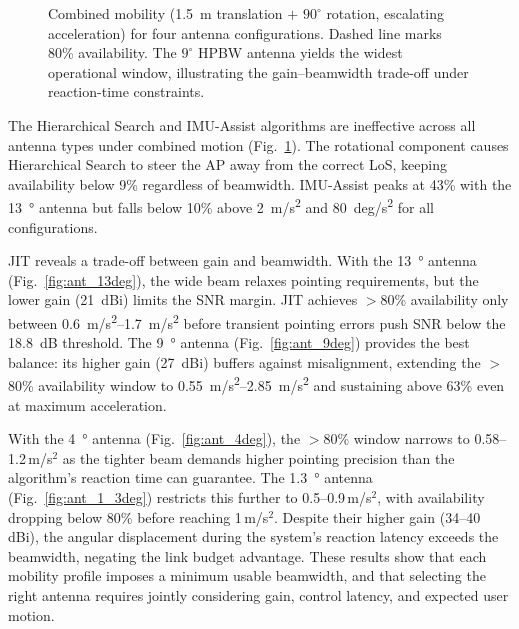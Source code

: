 \documentclass[fleqn,10pt]{wlscirep}
\newcommand{\legline}[2]{%
    \tikz[baseline=-0.5ex]{
        \draw[#1, #2, line width=1.5pt] (0,0) -- (0.5,0);
    }%
}
\begin{document}
\begin{figure}[ht!]
    
    \caption{Combined mobility (1.5~m translation $+$ $90^\circ$ rotation, escalating acceleration) for four antenna configurations. Dashed line marks 80\% availability. The $9^\circ$ HPBW antenna yields the widest operational window, illustrating the gain--beamwidth trade-off under reaction-time constraints.}
    \label{fig:antenna_comparison}
    \vspace{-5pt}
\end{figure}

The Hierarchical Search and IMU-Assist algorithms are ineffective across all antenna types under combined motion (Fig.~\ref{fig:antenna_comparison}). The rotational component causes Hierarchical Search to steer the AP away from the correct LoS, keeping availability below 9\% regardless of beamwidth. IMU-Assist peaks at 43\% with the \SI{13}{\degree} antenna but falls below 10\% above \SI{2}{m/s^2} and \SI{80}{deg/s^2} for all configurations.

JIT reveals a trade-off between gain and beamwidth. With the \SI{13}{\degree} antenna (Fig.~\ref{fig:ant_13deg}), the wide beam relaxes pointing requirements, but the lower gain (\SI{21}{dBi}) limits the SNR margin. JIT achieves $>$80\% availability only between \SIrange{0.6}{1.7}{m/s^2} before transient pointing errors push SNR below the \SI{18.8}{dB} threshold. The \SI{9}{\degree} antenna (Fig.~\ref{fig:ant_9deg}) provides the best balance: its higher gain (\SI{27}{dBi}) buffers against misalignment, extending the $>$80\% availability window to \SIrange{0.55}{2.85}{m/s^2} and sustaining above 63\% even at maximum acceleration.

With the \SI{4}{\degree} antenna (Fig.~\ref{fig:ant_4deg}), the $>$80\% window narrows to 0.58--1.2\,m/s$^2$ as the tighter beam demands higher pointing precision than the algorithm's reaction time can guarantee. The \SI{1.3}{\degree} antenna (Fig.~\ref{fig:ant_1_3deg}) restricts this further to 0.5--0.9\,m/s$^2$, with availability dropping below 80\% before reaching 1\,m/s$^2$. Despite their higher gain (34--40\,dBi), the angular displacement during the system's reaction latency exceeds the beamwidth, negating the link budget advantage. These results show that each mobility profile imposes a minimum usable beamwidth, and that selecting the right antenna requires jointly considering gain, control latency, and expected user motion.
\end{document}
